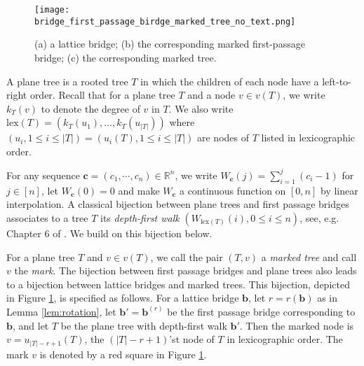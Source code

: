 \begin{figure}[h]
\centering
\begin{minipage}{\textwidth}
\texttt{[image: bridge\_first\_passage\_birdge\_marked\_tree\_no\_text.png]}
\caption{(a) a lattice bridge; (b) the corresponding marked first-passage bridge; (c) the corresponding marked tree.}
\label{fig: latticebridge_firstpassagebridge_marketree}
\end{minipage}
\end{figure}


A plane tree is a rooted tree $T$ in which the children of each node have a left-to-right order. Recall that for a plane tree $T$ and a node $v\in v(T)$, we write $k_T(v)$ to denote the degree of $v$ in $T$. We also write $\mathrm{lex}(T)=(k_T(u_1), \ldots, k_T(u_{|T|}))$ where $(u_i, 1\le i\le |T|)=(u_i(T), 1\le i\le |T|)$ are nodes of $T$ listed in lexicographic order. 

For any sequence $\mathbf{c}=(c_1, \cdots, c_n)\in\mathbb{R}^n$, we write $W_{\mathbf{c}}(j)=\sum\limits_{i=1}^j(c_i-1)$ for $j\in [n]$, let $W_{\mathbf{c}}(0)=0$ and make $W_{\mathbf{c}}$ a continuous function on $[0, n]$ by linear interpolation. 
A classical bijection between plane trees and first passage bridges associates to a tree $T$ its {\em depth-first walk} $(W_{\mathrm{lex}(T)}(i), 0\le i\le n)$, see, e.g. Chapter 6 of \cite{Pitman2006}. We build on this bijection below.

For a plane tree $T$ and $v\in v(T)$, we call the pair $(T, v)$ a {\em marked tree} and call $v$ the {\em mark}. The bijection between first passage bridges and plane trees also leads to a bijection between lattice bridges and marked trees. This bijection, depicted in Figure \ref{fig: latticebridge_firstpassagebridge_marketree}, is specified as follows. For a lattice bridge $\mathbf{b}$, let $r=r(\mathbf{b})$ as in Lemma \ref{lem:rotation}, let $\mathbf{b}'=\mathbf{b}^{(r)}$ be the first passage bridge corresponding to $\mathbf{b}$, and let $T$ be the plane tree with depth-first walk $\mathbf{b}'$. Then the marked node is $v=u_{|T|-r+1}(T)$, the $(|T|-r+1)$'st node of $T$ in lexicographic order. The mark $v$ is denoted by a red square in Figure \ref{fig: latticebridge_firstpassagebridge_marketree}. 

